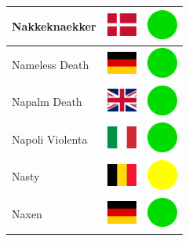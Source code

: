 \documentclass[12pt, a4paper, twoside]{report}
\begin{document}
\begin{center}
\begin{longtable}{|p{5cm}|p{2cm}|p{2cm}|}
 Nakkeknaekker                                              & \includegraphics[width=1cm]{../4x3/dk} &   \includegraphics[width=1cm]{../likes/y} \\ \hline
 Nameless Death                                             & \includegraphics[width=1cm]{../4x3/de} &   \includegraphics[width=1cm]{../likes/y} \\ \hline
 Napalm Death                                               & \includegraphics[width=1cm]{../4x3/gb} &   \includegraphics[width=1cm]{../likes/y} \\ \hline
 Napoli Violenta                                            & \includegraphics[width=1cm]{../4x3/it} &   \includegraphics[width=1cm]{../likes/y} \\ \hline
 Nasty                                                      & \includegraphics[width=1cm]{../4x3/be} &   \includegraphics[width=1cm]{../likes/m} \\ \hline
 Naxen                                                      & \includegraphics[width=1cm]{../4x3/de} &   \includegraphics[width=1cm]{../likes/y} \\ \hline

\end{longtable}
\end{center}
\end{document}
